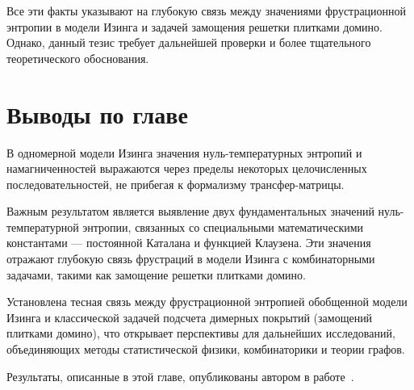 Все эти факты указывают на глубокую связь между значениями фрустрационной энтропии в модели Изинга и задачей замощения решетки плитками домино. Однако, данный тезис требует дальнейшей проверки и более тщательного теоретического обоснования.

\section{Выводы по главе}

В одномерной модели Изинга значения нуль-температурных энтропий и намагниченностей выражаются через пределы некоторых целочисленных последовательностей, не  прибегая к формализму трансфер-матрицы.

Важным результатом является выявление двух фундаментальных значений нуль-температурной энтропии, связанных со специальными математическими константами — постоянной Каталана и функцией Клаузена. Эти значения отражают глубокую связь фрустраций в модели Изинга с комбинаторными задачами, такими как замощение решетки плитками домино.

Установлена тесная связь между фрустрационной энтропией обобщенной модели Изинга и классической задачей подсчета димерных покрытий (замощений плитками домино), что открывает перспективы для дальнейших исследований, объединяющих методы статистической физики, комбинаторики и теории графов.

Результаты, описанные в этой главе, опубликованы автором в работе~\cite{vakbib3}.

\FloatBarrier